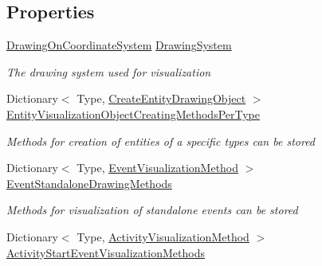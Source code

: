 \subsection*{Properties}
\begin{DoxyCompactItemize}
\item 
\hyperlink{class_w_p_f_visualization_base_1_1_drawing_on_coordinate_system}{Drawing\+On\+Coordinate\+System} \hyperlink{class_simulation_w_p_f_visualization_tools_1_1_base_w_p_f_control_unit_visualization_engine_a34be4e7c196154b4ee685030d372915b}{Drawing\+System}
\begin{DoxyCompactList}\small\item\em The drawing system used for visualization \end{DoxyCompactList}\item 
Dictionary$<$ Type, \hyperlink{class_simulation_w_p_f_visualization_tools_1_1_base_w_p_f_control_unit_visualization_engine_a0bf5a50ae5ebe55e73272b1da3503c34}{Create\+Entity\+Drawing\+Object} $>$ \hyperlink{class_simulation_w_p_f_visualization_tools_1_1_base_w_p_f_control_unit_visualization_engine_a7fbf32ab71dabe247624a8a78d3d345b}{Entity\+Visualization\+Object\+Creating\+Methods\+Per\+Type}
\begin{DoxyCompactList}\small\item\em Methods for creation of entities of a specific types can be stored \end{DoxyCompactList}\item 
Dictionary$<$ Type, \hyperlink{class_simulation_w_p_f_visualization_tools_1_1_base_w_p_f_control_unit_visualization_engine_a86023dd4efa2f4518e3f27353effa5e8}{Event\+Visualization\+Method} $>$ \hyperlink{class_simulation_w_p_f_visualization_tools_1_1_base_w_p_f_control_unit_visualization_engine_a728acf30d91644e8fb9ae972b30dfe82}{Event\+Standalone\+Drawing\+Methods}
\begin{DoxyCompactList}\small\item\em Methods for visualization of standalone events can be stored \end{DoxyCompactList}\item 
Dictionary$<$ Type, \hyperlink{class_simulation_w_p_f_visualization_tools_1_1_base_w_p_f_control_unit_visualization_engine_a439b942d3344f348d72a0c88a98df938}{Activity\+Visualization\+Method} $>$ \hyperlink{class_simulation_w_p_f_visualization_tools_1_1_base_w_p_f_control_unit_visualization_engine_af72f38fd97a3f7db427ae07156b894b0}{Activity\+Start\+Event\+Visualization\+Methods}

\end{DoxyCompactItemize}
